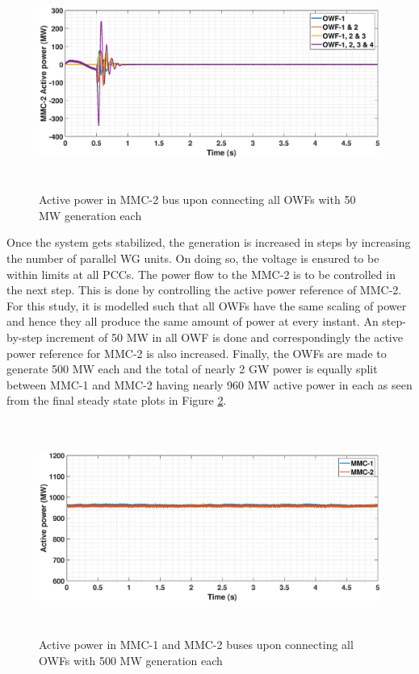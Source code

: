 \begin{figure}[H]
    \includegraphics[height = 7cm,width = \textwidth]{Diagrams/Chapter_5/P_MMC_2_WT1234connect.eps}
    \caption{Active power in MMC-2 bus upon connecting all OWFs with 50 MW generation each}
    \label{P_MMC_2_WT1234connect}
\end{figure}

Once the system gets stabilized, the generation is increased in steps by increasing the number of parallel \gls{WG} units. On doing so, the voltage is ensured to be within limits at all \gls{PCC}s. The power flow to the \gls{MMC}-2 is to be controlled in the next step. This is done by controlling the active power reference of \gls{MMC}-2. For this study, it is modelled such that all \gls{OWF}s have the same scaling of power and hence they all produce the same amount of power at every instant. An step-by-step increment of 50 MW in all \gls{OWF} is done and correspondingly the active power reference for \gls{MMC}-2 is also increased. Finally, the \gls{OWF}s are made to generate 500 MW each and the total of nearly 2 GW power is equally split between \gls{MMC}-1 and \gls{MMC}-2 having nearly 960 MW active power in each as seen from the final steady state plots in Figure \ref{P_MMC_1_2_All_WTconnect}.

\begin{figure}[H]
\centering
    \includegraphics[height = 7cm,width = \textwidth]{Diagrams/Chapter_5/P_MMC_1_2_All_WTconnect.eps}
    \caption{Active power in MMC-1 and MMC-2 buses upon connecting all OWFs with 500 MW generation each}
    \label{P_MMC_1_2_All_WTconnect}
\end{figure}

